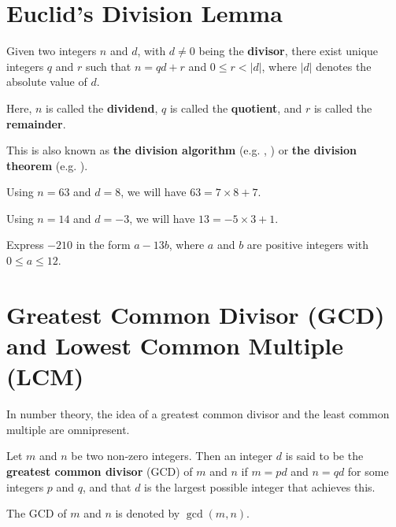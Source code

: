 \section{Euclid's Division Lemma}
\begin{lemma}\label{lemma-euclid-division}
    Given two integers $n$ and $d$, with $d \neq 0$ being the \textbf{divisor}, there exist unique integers $q$ and $r$ such that $n = qd + r$ and $0 \leq r < |d|$, where $|d|$ denotes the absolute value of $d$.

    Here, $n$ is called the \textbf{dividend}, $q$ is called the \textbf{quotient}, and $r$ is called the \textbf{remainder}.
\end{lemma}
\begin{remark}
    This is also known as \textbf{the division algorithm} (e.g. \cite[p.~4]{dummit_foote_2004}, \cite[p.~3]{gallian_2016}) or \textbf{the division theorem} (e.g. \cite[\S 21]{clark_1984}).
\end{remark}

\begin{example}
    Using $n = 63$ and $d = 8$, we will have $63 = 7\times8 + 7$.
\end{example}
\begin{example}
    Using $n = 14$ and $d = -3$, we will have $13 = -5\times3 + 1$.
\end{example}

\begin{exercise}
    Express $-210$ in the form $a-13b$, where $a$ and $b$ are positive integers with $0 \leq a \leq 12$.
\end{exercise}

\section{Greatest Common Divisor (GCD) and Lowest Common Multiple (LCM)}
In number theory, the idea of a greatest common divisor and the least common multiple are omnipresent.

\begin{definition}
    Let $m$ and $n$ be two non-zero integers. Then an integer $d$ is said to be the \textbf{greatest common divisor} (GCD) of $m$ and $n$ if $m = pd$ and $n = qd$ for some integers $p$ and $q$, and that $d$ is the largest possible integer that achieves this.

    The GCD of $m$ and $n$ is denoted by $\gcd(m, n)$.
\end{definition}

